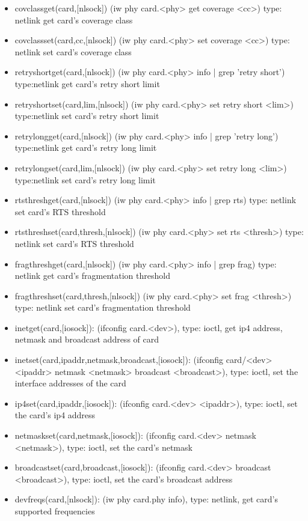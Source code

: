 \documentclass[11pt]{article}
\begin{document}
\begin{appendices}
\begin{itemize}
\item covclassget(card,[nlsock]) (iw phy card.<phy> get coverage <cc>) type:
netlink get card's coverage class
\item covclassset(card,cc,[nlsock]) (iw phy card.<phy> set coverage <cc>) type:
netlink set card's coverage class
\item retryshortget(card,[nlsock]) (iw phy card.<phy> info | grep 'retry short')
type:netlink get card's retry short limit
\item retryshortset(card,lim,[nlsock]) (iw phy card.<phy> set retry short <lim>)
type:netlink set card's retry short limit
\item retrylongget(card,[nlsock]) (iw phy card.<phy> info | grep 'retry long')
type:netlink get card's retry long limit
\item retrylongset(card,lim,[nlsock]) (iw phy card.<phy> set retry long <lim>)
type:netlink set card's retry long limit
\item rtsthreshget(card,[nlsock]) (iw phy card.<phy> info | grep rts) type: 
netlink set card's RTS threshold
\item rtsthreshset(card,thresh,[nlsock]) (iw phy card.<phy> set rts <thresh>) type: 
netlink set card's RTS threshold
\item fragthreshget(card,[nlsock]) (iw phy card.<phy> info | grep frag) type: 
netlink get card's fragmentation threshold
\item fragthreshset(card,thresh,[nlsock]) (iw phy card.<phy> set frag <thresh>) type: 
netlink set card's fragmentation threshold
\item inetget(card,[iosock]): (ifconfig card.<dev>), type: ioctl, get ip4 address,
netmask and broadcast address of card
\item inetset(card,ipaddr,netmask,broadcast,[iosock]): (ifconfig card/<dev> <ipaddr>
netmask <netmask> broadcast <broadcast>), type: ioctl, set the interface addresses
of the card
\item ip4set(card,ipaddr,[iosock]): (ifconfig card.<dev> <ipaddr>), type: ioctl,
set the card's ip4 address
\item netmaskset(card,netmask,[iosock]): (ifconfig card.<dev> netmask <netmask>), 
type: ioctl, set the card's netmask
\item broadcastset(card,broadcast,[iosock]): (ifconfig card.<dev> broadcast 
<broadcast>), type: ioctl, set the card's broadcast address
\item devfreqs(card,[nlsock]): (iw phy card.phy info), type: netlink, get card's 
supported frequencies

\end{itemize}
\end{appendices}
\end{document}
